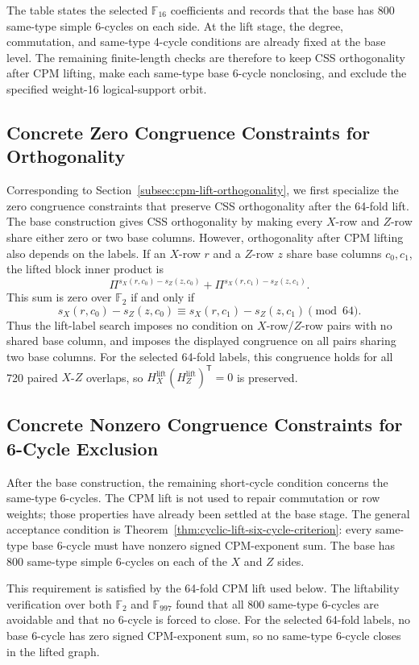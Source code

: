 \documentclass[11pt,a4paper]{article}
\newcommand{\F}{\mathbb{F}}
\newcommand{\HXL}{H_X^{\mathrm{lift}}}
\newcommand{\HZL}{H_Z^{\mathrm{lift}}}
\theoremstyle{uprighttheorem}
\begin{document}
The table states the selected \(\F_{16}\) coefficients and records that the base has 800 same-type simple 6-cycles on each side.
At the lift stage, the degree, commutation, and same-type 4-cycle conditions are already fixed at the base level.
The remaining finite-length checks are therefore to keep CSS orthogonality after CPM lifting, make each same-type base 6-cycle nonclosing, and exclude the specified weight-16 logical-support orbit.

\subsection{Concrete Zero Congruence Constraints for Orthogonality}
Corresponding to Section~\ref{subsec:cpm-lift-orthogonality}, we first specialize the zero congruence constraints that preserve CSS orthogonality after the 64-fold lift.
The base construction gives CSS orthogonality by making every \(X\)-row and \(Z\)-row share either zero or two base columns.
However, orthogonality after CPM lifting also depends on the labels.
If an \(X\)-row \(r\) and a \(Z\)-row \(z\) share base columns \(c_0,c_1\), the lifted block inner product is
\[
  \Pi^{s_X(r,c_0)-s_Z(z,c_0)}
  +
  \Pi^{s_X(r,c_1)-s_Z(z,c_1)} .
\]
This sum is zero over \(\F_2\) if and only if
\[
  s_X(r,c_0)-s_Z(z,c_0)
  \equiv
  s_X(r,c_1)-s_Z(z,c_1)
  \pmod {64}.
\]
Thus the lift-label search imposes no condition on \(X\)-row/\(Z\)-row pairs with no shared base column, and imposes the displayed congruence on all pairs sharing two base columns.
For the selected 64-fold labels, this congruence holds for all 720 paired \(X\)-\(Z\) overlaps, so \(\HXL(\HZL)^{\mathsf T}=0\) is preserved.

\subsection{Concrete Nonzero Congruence Constraints for 6-Cycle Exclusion}
After the base construction, the remaining short-cycle condition concerns the same-type 6-cycles.
The CPM lift is not used to repair commutation or row weights; those properties have already been settled at the base stage.
The general acceptance condition is Theorem~\ref{thm:cyclic-lift-six-cycle-criterion}: every same-type base 6-cycle must have nonzero signed CPM-exponent sum.
The base has 800 same-type simple 6-cycles on each of the $X$ and $Z$ sides.

This requirement is satisfied by the 64-fold CPM lift used below.
The liftability verification over both $\F_2$ and $\F_{997}$ found that all 800 same-type 6-cycles are avoidable and that no 6-cycle is forced to close.
For the selected 64-fold labels, no base 6-cycle has zero signed CPM-exponent sum, so no same-type 6-cycle closes in the lifted graph.
\end{document}
